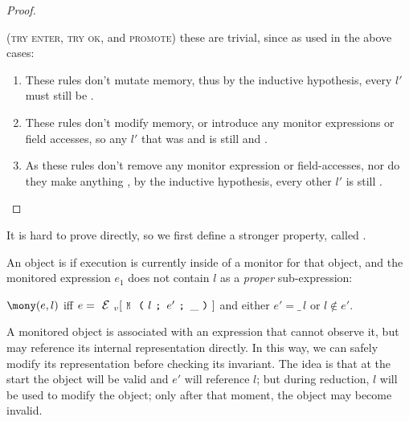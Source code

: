 \begin{proof}
\begin{ienumerate}
\item (\textsc{try enter}, \textsc{try ok}, and \textsc{promote}) these are trivial, since as used in the above cases:
\begin{enumerate}
	\item These rules don't mutate memory, thus by the inductive hypothesis, every $l'$ must still be \RNC.
	\item These rules don't modify memory, or introduce any monitor expressions or field accesses, so any $l'$ that was \ENR and \NRM is still \ENR and \NRM.
	\item As these rules don't remove any monitor expression or field-accesses, nor do they make anything \reach, by the inductive hypothesis, every other $l'$ is still \HNO.
\end{enumerate}

\end{ienumerate}
\end{proof}

It is hard to prove  directly,
so we first define a stronger property,
called .

An object is \mony if execution
is currently inside of a monitor for that object, and
the monitored expression $e_1$ does not
contain $l$ as a \emph{proper} sub-expression:

\indent $\mony(e,l)$ iff
$e=\EV[\M{l}{e'}{\_}]$ and either $e'=\_\,l$ or $l \notin e'$.%

\noindent A monitored object is associated with an expression that cannot observe it, but may
reference its internal representation directly.
In this way, we can safely modify its representation before checking its invariant.
The idea is that at the start the object will be valid and $e'$ will reference $l$;
but during reduction, $l$ will be used to
modify the object; only after that moment, the object may become invalid.

